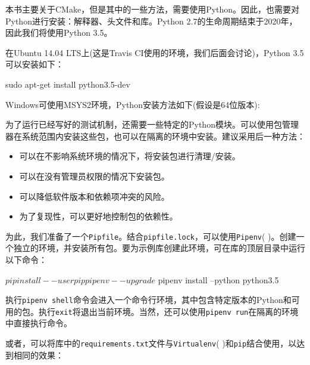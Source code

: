 
本书主要关于CMake，但是其中的一些方法，需要使用Python。因此，也需要对Python进行安装：解释器、头文件和库。Python 2.7的生命周期结束于2020年，因此我们将使用Python 3.5。

在Ubuntu 14.04 LTS上(这是Travis CI使用的环境，我们后面会讨论)，Python 3.5可以安装如下：

\begin{codebox}[shell]
sudo apt-get install python3.5-dev
\end{codebox}

Windows可使用MSYS2环境，Python安装方法如下(假设是64位版本):


为了运行已经写好的测试机制，还需要一些特定的Python模块。可以使用包管理器在系统范围内安装这些包，也可以在隔离的环境中安装。建议采用后一种方法：

\begin{itemize}
\item 可以在不影响系统环境的情况下，将安装包进行清理/安装。

\item 可以在没有管理员权限的情况下安装包。

\item 可以降低软件版本和依赖项冲突的风险。

\item 为了复现性，可以更好地控制包的依赖性。

\end{itemize}

为此，我们准备了一个\texttt{Pipfile}。结合\texttt{pipfile.lock}，可以使用\texttt{Pipenv}(  )。创建一个独立的环境，并安装所有包。要为示例库创建此环境，可在库的顶层目录中运行以下命令：

\begin{codebox}[shell]
$ pip install --user pip pipenv --upgrade
$ pipenv install --python python3.5
\end{codebox}

执行\texttt{pipenv shell}命令会进入一个命令行环境，其中包含特定版本的Python和可用的包。执行\texttt{exit}将退出当前环境。当然，还可以使用\texttt{pipenv run}在隔离的环境中直接执行命令。

或者，可以将库中的\texttt{requirements.txt}文件与\texttt{Virtualenv}(  )和\texttt{pip}结合使用，以达到相同的效果：

